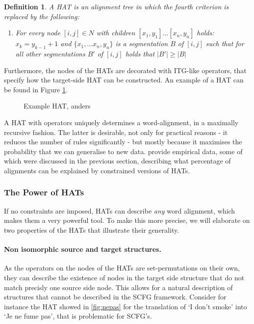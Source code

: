 \documentclass{report}
\theoremstyle{definition}
\theoremstyle{plain}
\newtheorem{definition}{Definition}
\begin{document}
\begin{definition}
A HAT is an alignment tree in which the fourth criterion is replaced by the following:
\begin{enumerate}
\item[4.] For every node $[i,j] \in N$ with children $[x_1,y_1]\ldots [x_n,y_n]$ holds: $x_k = y_{k-1}+1$ and $\{x_1,\ldots x_n, y_n\}$ is a segmentation $B$ of $[i,j]$ such that for all other segmentations $B'$ of $[i,j]$ holds that $|B'|\geq |B|$ %
\end{enumerate}
\end{definition}

Furthermore, the nodes of the HATs are decorated with ITG-like operators, that specify how the target-side HAT can be constructed. An example of a HAT can be found in Figure \ref{fig:hat}.

\begin{figure}
\caption{Example HAT, anders}\label{fig:hat}
\end{figure}

A HAT with operators uniquely determines a word-alignment, in a maximally recursive fashion. The latter is desirable, not only for practical reasons - it reduces the number of rules significantly - but mostly because it maximises the probability that we can generalise to new data. \cite{simaan2013hats} provide empirical data, some of which were discussed in the previous section, describing what percentage of alignments can be explained by constrained versions of HATs. 

\subsubsection{The Power of HATs}

If no constraints are imposed, HATs can describe \textit{any} word alignment, which makes them a very powerful tool. To make this more precise, we will elaborate on two properties of the HATs that illustrate their generality.

\paragraph{Non isomorphic source and target structures.} As the operators on the nodes of the HATs are set-permutations on their own, they can describe the existence of nodes in the target side structure that do not match precisly one source side node. This allows for a natural description of structures that cannot be described in the SCFG framework. Consider for instance the HAT showed in \ref{fig:nepas} for the translation of `I don't smoke' into `Je ne fume pas', that is problematic for SCFG's.
\end{document}
